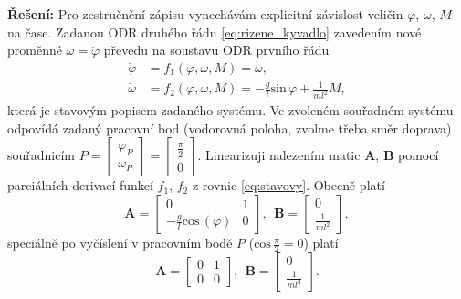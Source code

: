 \documentclass[twoside]{article}
\begin{document}
\textbf{Řešení:}
Pro zestručnění zápisu vynechávám explicitní závislost veličin $\varphi$, $\omega$, $M$ na čase.
Zadanou ODR druhého řádu \eqref{eq:rizene_kyvadlo} zavedením nové proměnné $\omega = \dot{\varphi}$ převedu na soustavu ODR prvního řádu
\begin{equation}
	\begin{split}
		\dot{\varphi} &= f_1(\varphi, \omega, M) = \omega, \\
		\dot{\omega} &= f_2(\varphi, \omega, M) = - \frac{g}{l} \text{sin}\, \varphi + \frac{1}{ml^2} M,
	\end{split}
	\label{eq:stavovy}
\end{equation}
která je stavovým popisem zadaného systému. Ve zvoleném souřadném systému odpovídá zadaný pracovní bod (vodorovná poloha, zvolme třeba směr doprava)
souřadnicím $P = \begin{bmatrix}
	\varphi_P \\ \omega_P
\end{bmatrix} = \begin{bmatrix}
	\frac{\pi}{2} \\ 0
\end{bmatrix}$. Linearizuji nalezením matic $\mathbf{A}$, $\mathbf{B}$ pomocí parciálních derivací funkcí $f_1$, $f_2$ z rovnic \eqref{eq:stavovy}.
Obecně platí
\begin{equation}
	\mathbf{A} = \begin{bmatrix}
		0 & 1 \\
		- \frac{g}{l} \text{cos}\, (\varphi) & 0
	\end{bmatrix},~~\mathbf{B} = \begin{bmatrix}
		0 \\ \frac{1}{ml^2}
	\end{bmatrix},
\end{equation}
speciálně po vyčíslení v pracovním bodě $P$ ($\text{cos}\,\frac{\pi}{2} = 0$) platí
\begin{equation}
	\mathbf{A} = \begin{bmatrix}
		0 & 1 \\
		0 & 0
	\end{bmatrix},~~\mathbf{B} = \begin{bmatrix}
		0 \\ \frac{1}{ml^2}
	\end{bmatrix}.
\end{equation}
\end{document}

